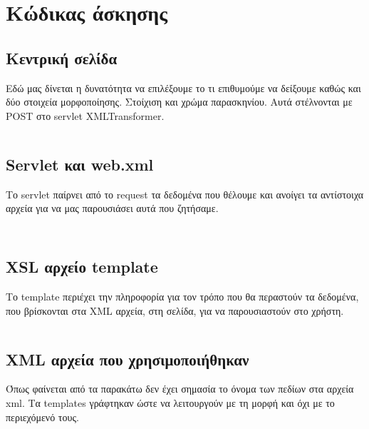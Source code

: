 \documentclass[a4paper,9pt]{article}
\begin{document}
\def\thesection {Μέρος \alph{section}}
\def\thesubsection {\roman{subsection}.}




\section*{Κώδικας άσκησης}
\subsection{Κεντρική σελίδα}
Εδώ μας δίνεται η δυνατότητα να επιλέξουμε το τι επιθυμούμε να δείξουμε καθώς
και δύο στοιχεία μορφοποίησης. Στοίχιση και χρώμα παρασκηνίου. Αυτά στέλνονται
με POST στο servlet XMLTransformer.
\inputminted[linenos,fontsize=\scriptsize]{html}{files/index.html}
\subsection{Servlet και web.xml}
Το servlet παίρνει από το request τα δεδομένα που θέλουμε και ανοίγει τα
αντίστοιχα αρχεία για να μας παρουσιάσει αυτά που ζητήσαμε.
\inputminted[linenos,fontsize=\scriptsize]{java}{files/XMLTransformer.java}
\inputminted[linenos,fontsize=\scriptsize]{xml}{files/web.xml}

\subsection{XSL αρχείο template}
Το template περιέχει την πληροφορία για τον τρόπο που θα περαστούν τα
δεδομένα, που βρίσκονται στα XML αρχεία, στη σελίδα, για να παρουσιαστούν στο
χρήστη.
\inputminted[linenos,fontsize=\scriptsize]{xml}{files/present.xsl}

\subsection{XML αρχεία που χρησιμοποιήθηκαν}
Όπως φαίνεται από τα παρακάτω δεν έχει σημασία το όνομα των πεδίων στα αρχεία
xml. Τα templates γράφτηκαν ώστε να λειτουργούν με τη μορφή και όχι με το
περιεχόμενό τους.
\inputminted[linenos,fontsize=\scriptsize]{xml}{files/Airplanes.xml}
\inputminted[linenos,fontsize=\scriptsize]{xml}{files/Books.xml}
\inputminted[linenos,fontsize=\scriptsize]{xml}{files/Cars.xml}
\end{document}
